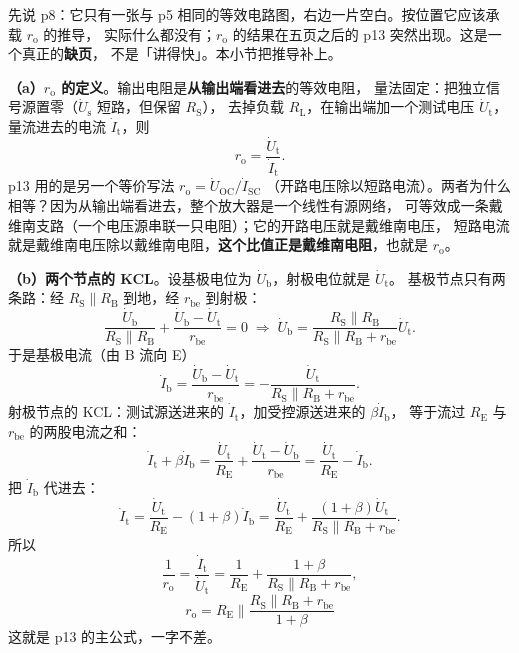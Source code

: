 \documentclass[11pt]{ctexart}
\begin{document}
先说 p8：它只有一张与 p5 相同的等效电路图，右边一片空白。按位置它应该承载 $r_{\mathrm{o}}$ 的推导，
实际什么都没有；$r_{\mathrm{o}}$ 的结果在五页之后的 p13 突然出现。这是一个真正的\textbf{缺页}，
不是「讲得快」。本小节把推导补上。

\textbf{（a）$r_{\mathrm{o}}$ 的定义}。输出电阻是\textbf{从输出端看进去}的等效电阻，
量法固定：把独立信号源置零（$\dot U_{\mathrm{s}}$ 短路，但保留 $R_{\mathrm{S}}$），
去掉负载 $R_{\mathrm{L}}$，在输出端加一个测试电压 $\dot U_{\mathrm{t}}$，
量流进去的电流 $\dot I_{\mathrm{t}}$，则
\[
r_{\mathrm{o}}=\frac{\dot U_{\mathrm{t}}}{\dot I_{\mathrm{t}}} .
\]
p13 用的是另一个等价写法 $r_{\mathrm{o}}=\dot U_{\mathrm{OC}}/\dot I_{\mathrm{SC}}$
（开路电压除以短路电流）。两者为什么相等？因为从输出端看进去，整个放大器是一个线性有源网络，
可等效成一条戴维南支路（一个电压源串联一只电阻）；它的开路电压就是戴维南电压，
短路电流就是戴维南电压除以戴维南电阻，\textbf{这个比值正是戴维南电阻}，也就是 $r_{\mathrm{o}}$。


\textbf{（b）两个节点的 KCL}。设基极电位为 $\dot U_{\mathrm{b}}$，射极电位就是 $\dot U_{\mathrm{t}}$。
基极节点只有两条路：经 $R_{\mathrm{S}}\parallel R_{\mathrm{B}}$ 到地，经 $r_{\mathrm{be}}$ 到射极：
\[
\frac{\dot U_{\mathrm{b}}}{R_{\mathrm{S}}\parallel R_{\mathrm{B}}}+\frac{\dot U_{\mathrm{b}}-\dot U_{\mathrm{t}}}{r_{\mathrm{be}}}=0
\;\Longrightarrow\;
\dot U_{\mathrm{b}}=\frac{R_{\mathrm{S}}\parallel R_{\mathrm{B}}}{R_{\mathrm{S}}\parallel R_{\mathrm{B}}+r_{\mathrm{be}}}\dot U_{\mathrm{t}} .
\]
于是基极电流（由 B 流向 E）
\[
\dot I_{\mathrm{b}}=\frac{\dot U_{\mathrm{b}}-\dot U_{\mathrm{t}}}{r_{\mathrm{be}}}
=-\frac{\dot U_{\mathrm{t}}}{R_{\mathrm{S}}\parallel R_{\mathrm{B}}+r_{\mathrm{be}}} .
\]
射极节点的 KCL：测试源送进来的 $\dot I_{\mathrm{t}}$，加受控源送进来的 $\beta\dot I_{\mathrm{b}}$，
等于流过 $R_{\mathrm{E}}$ 与 $r_{\mathrm{be}}$ 的两股电流之和：
\[
\dot I_{\mathrm{t}}+\beta\dot I_{\mathrm{b}}
=\frac{\dot U_{\mathrm{t}}}{R_{\mathrm{E}}}+\frac{\dot U_{\mathrm{t}}-\dot U_{\mathrm{b}}}{r_{\mathrm{be}}}
=\frac{\dot U_{\mathrm{t}}}{R_{\mathrm{E}}}-\dot I_{\mathrm{b}} .
\]
把 $\dot I_{\mathrm{b}}$ 代进去：
\[
\dot I_{\mathrm{t}}=\frac{\dot U_{\mathrm{t}}}{R_{\mathrm{E}}}-(1+\beta)\dot I_{\mathrm{b}}
=\frac{\dot U_{\mathrm{t}}}{R_{\mathrm{E}}}+\frac{(1+\beta)\dot U_{\mathrm{t}}}{R_{\mathrm{S}}\parallel R_{\mathrm{B}}+r_{\mathrm{be}}} .
\]
所以
\[
\frac{1}{r_{\mathrm{o}}}=\frac{\dot I_{\mathrm{t}}}{\dot U_{\mathrm{t}}}
=\frac{1}{R_{\mathrm{E}}}+\frac{1+\beta}{R_{\mathrm{S}}\parallel R_{\mathrm{B}}+r_{\mathrm{be}}},
\]
\[
\boxed{\;r_{\mathrm{o}}=R_{\mathrm{E}}\parallel\frac{R_{\mathrm{S}}\parallel R_{\mathrm{B}}+r_{\mathrm{be}}}{1+\beta}\;}
\]
这就是 p13 的主公式，一字不差。
\end{document}
